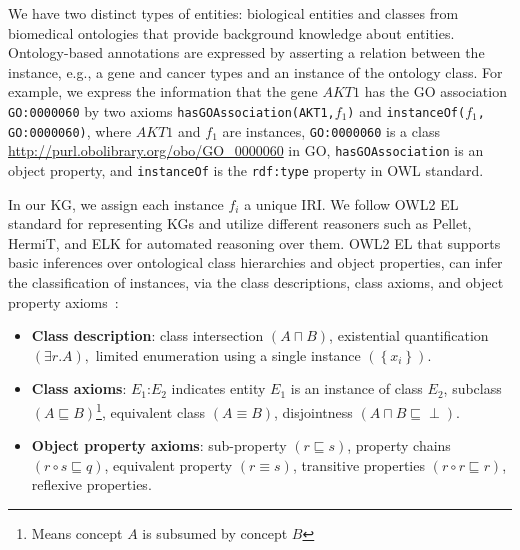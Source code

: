 \hspace*{3.5mm} We have two distinct types of entities: biological entities and classes from biomedical ontologies that provide background knowledge about entities. Ontology-based annotations are expressed by asserting a relation between the instance, e.g., a gene and cancer types and an instance of the ontology class. For example, we express the information that the gene $AKT1$ has the GO association \texttt{GO:0000060} by two axioms \texttt{hasGOAssociation(AKT1,$f_1$)} and \texttt{instanceOf($f_1$, GO:0000060)}, where $AKT1$ and $f_1$ are instances, \texttt{GO:0000060} is a class \url{http://purl.obolibrary.org/obo/GO\_0000060} in GO, \texttt{hasGOAssociation} is an object property, and \texttt{instanceOf} is the \texttt{rdf:type} property in OWL standard. 

\hspace*{3.5mm} In our KG, we assign each instance $f_i$ a unique IRI. We follow OWL2 EL standard for representing KGs and utilize different reasoners such as Pellet, HermiT, and ELK for automated reasoning over them. OWL2 EL that supports basic inferences over ontological class hierarchies and object properties, can infer the classification of instances, via  the class descriptions, class axioms, and object property axioms~\cite{alshahrani2017neuro}: 

\begin{itemize}[noitemsep]
\vspace{-6mm}
    \item \textbf{Class description}: class intersection $(A \sqcap B)$, existential quantification $(\exists r . A),$ limited enumeration using a single instance $\left(\left\{x_{i}\right\}\right)$. 
    \item \textbf{Class axioms}: $E_{1}$:$E_{2}$ indicates entity $E_{1}$ is an instance of class $E_{2}$, subclass $(A \sqsubseteq B)$\footnote{Means concept $A$ is subsumed by concept $B$}, equivalent class $(A \equiv B)$, disjointness $(A \sqcap B \sqsubseteq \perp)$. 
    \item \textbf{Object property axioms}: sub-property $(r \sqsubseteq s)$, property chains $(r \circ s \sqsubseteq q)$, equivalent property $(r \equiv s)$, transitive properties $(r \circ r \sqsubseteq r)$, reflexive properties. 
    \vspace{-6mm}
\end{itemize}

